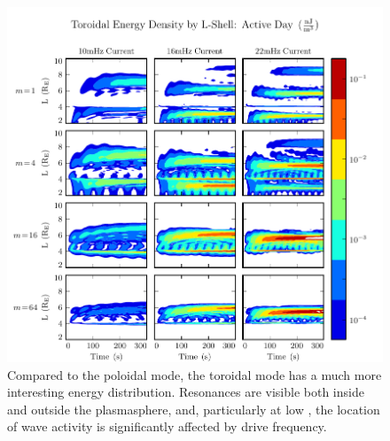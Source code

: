 \begin{figure}[H]
    \centering
    \includegraphics[width=\textwidth]{figures/utorlayers_J_1.pdf}
    \caption[Toroidal Energy Density by L-Shell: Active Day]{
      Compared to the poloidal mode, the toroidal mode has a much more interesting energy distribution. Resonances are visible both inside and outside the plasmasphere, and, particularly at low \azm, the location of wave activity is significantly affected by drive frequency. 
    }
    \label{fig_utorlayers_J_1}
\end{figure}





